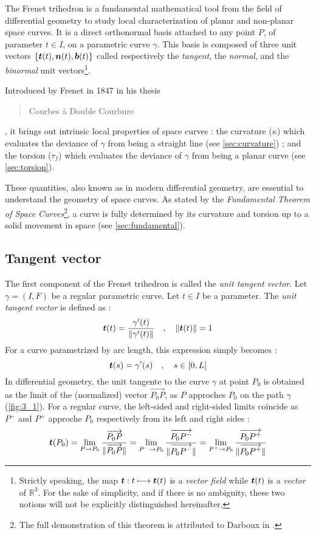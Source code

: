 The Frenet trihedron is a fundamental mathematical tool from the field of differential geometry to study local characterization of planar and non-planar space curves. It is a direct orthonormal basis attached to any point $P$, of parameter $t \in I$, on a parametric curve $\gamma$. This basis is composed of three unit vectors $\{\boldsymbol{t}(t),\boldsymbol{n}(t),\boldsymbol{b}(t)\}$ called respectively the \emph{tangent}, the \emph{normal}, and the \emph{binormal} unit vectors\footnote{
Strictly speaking, the map $\boldsymbol{t} : t \longmapsto \boldsymbol{t}(t)$ is a \emph{vector field} while $\boldsymbol{t}(t)$ is a \emph{vector} of $\mathbb{R}^3$. For the sake of simplicity, and if there is no ambiguity, these two notions will not be explicitly distinguished hereinafter.
}.

Introduced by Frenet in 1847 in his thesis \blockcquote[]{Frenet1852}{Courbes à Double Courbure}, it brings out intrinsic local properties of space curves : the curvature ($\kappa$) which evaluates the deviance of $\gamma$ from being a straight line (see \cref{sec:curvature}) ; and the torsion ($\tau_f$) which evaluates the deviance of $\gamma$ from being a planar curve (see \cref{sec:torsion}).

These quantities, also known as  in modern differential geometry, are essential to understand the geometry of space curves. As stated by the \emph{Fundamental Theorem of Space Curves}\footnote{The full demonstration of this theorem is attributed to Darboux in \cite[p.11]{Delcourt2007}.}, a curve is fully determined by its curvature and torsion up to a solid movement in space (see \cref{sec:fundamental}).

\subsection{Tangent vector}
The first component of the Frenet trihedron is called the \emph{unit tangent vector}. 
Let $\gamma = (I,F)$ be a regular parametric curve. Let $t \in I$ be a parameter. The \emph{unit tangent vector} is defined as :
\begin{equation}
	\boldsymbol{t}(t) = \frac{\gamma'(t)}{\lVert\gamma'(t)\rVert}
	\quad,\quad
	\lVert\boldsymbol{t}(t)\rVert=1
\end{equation}
For a curve parametrized by arc length, this expression simply becomes :
\begin{equation}
	\boldsymbol{t}(s) = \gamma'(s)
	\quad,\quad
	s \in [0,L]
\end{equation}
In differential geometry, the unit tangente to the curve $\gamma$ at point $P_0$ is obtained as the limit of the (normalized) vector $\overrightarrow{P_0 P}$, as $P$ approches $P_0$ on the path $\gamma$ (\cref{fig:3_1}). For a regular curve, the left-sided and right-sided limits coïncide as $P^-$ and $P^+$ approche $P_0$ respectively from its left and right sides :
\begin{equation}
	\boldsymbol{t}(P_0)
	= \lim_{P \to P_0}\frac{\overrightarrow{P_0 P}}{\lVert\overrightarrow{P_0 P}\rVert}
	= \lim_{P^- \to P_0}\frac{\overrightarrow{P_0 P^-}}{\lVert\overrightarrow{P_0 P^-}\rVert}
	= \lim_{P^+ \to P_0}\frac{\overrightarrow{P_0 P^+}}{\lVert\overrightarrow{P_0 P^+}\rVert}
\label{eq:3_4}
\end{equation}

